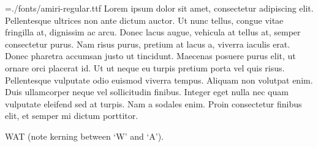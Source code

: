 
\nopagenumbers
\parindent=0mm
\font\amiri={./fonts/amiri-regular.ttf}
\amiri
Lorem ipsum dolor sit amet, consectetur adipiscing elit. Pellentesque ultrices non ante dictum auctor. Ut nunc tellus, congue vitae fringilla at, dignissim ac arcu. Donec lacus augue, vehicula at tellus at, semper consectetur purus. Nam risus purus, pretium at lacus a, viverra iaculis erat. Donec pharetra accumsan justo ut tincidunt. Maecenas posuere purus elit, ut ornare orci placerat id. Ut ut neque eu turpis pretium porta vel quis risus. Pellentesque vulputate odio euismod viverra tempus. Aliquam non volutpat enim. Duis ullamcorper neque vel sollicitudin finibus. Integer eget nulla nec quam vulputate eleifend sed at turpis. Nam a sodales enim. Proin consectetur finibus elit, et semper mi dictum porttitor.

WAT (note kerning between ‘W’ and ‘A’).
\bye
